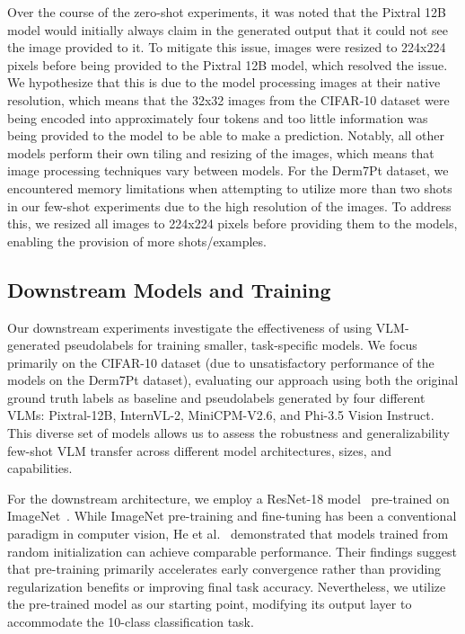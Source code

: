 \documentclass[../ShajiS_RnDReport.tex]{subfiles}
\begin{document}
Over the course of the zero-shot experiments, it was noted that the Pixtral 12B model would initially always claim in the generated output that it could not see the image provided to it. To mitigate this issue, images were resized to 224x224 pixels before being provided to the Pixtral 12B model, which resolved the issue. We hypothesize that this is due to the model processing images at their native resolution, which means that the 32x32 images from the CIFAR-10 dataset were being encoded into approximately four tokens and too little information was being provided to the model to be able to make a prediction. Notably, all other models perform their own tiling and resizing of the images, which means that image processing techniques vary between models. For the Derm7Pt dataset, we encountered memory limitations when attempting to utilize more than two shots in our few-shot experiments due to the high resolution of the images. To address this, we resized all images to 224x224 pixels before providing them to the models, enabling the provision of more shots/examples.

\subsection{Downstream Models and Training}
Our downstream experiments investigate the effectiveness of using VLM-generated pseudolabels for training smaller, task-specific models. We focus primarily on the CIFAR-10 dataset (due to unsatisfactory performance of the models on the Derm7Pt dataset), evaluating our approach using both the original ground truth labels as baseline and pseudolabels generated by four different VLMs: Pixtral-12B, InternVL-2, MiniCPM-V2.6, and Phi-3.5 Vision Instruct. This diverse set of models allows us to assess the robustness and generalizability few-shot VLM transfer across different model architectures, sizes, and capabilities.

For the downstream architecture, we employ a ResNet-18 model~\cite{He2016} pre-trained on ImageNet~\cite{Deng2009}. While ImageNet pre-training and fine-tuning has been a conventional paradigm in computer vision, He et al.~\cite{He2019} demonstrated that models trained from random initialization can achieve comparable performance. Their findings suggest that pre-training primarily accelerates early convergence rather than providing regularization benefits or improving final task accuracy. Nevertheless, we utilize the pre-trained model as our starting point, modifying its output layer to accommodate the 10-class classification task.
\end{document}
